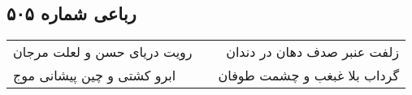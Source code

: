 \begin{center}
\section*{رباعی شماره ۵۰۵}
\label{sec:sh505}
\begin{longtable}{l p{0.5cm} r}
رویت دریای حسن و لعلت مرجان
&&
زلفت عنبر صدف دهان در دندان
\\
ابرو کشتی و چین پیشانی موج
&&
گرداب بلا غبغب و چشمت طوفان
\\
\end{longtable}
\end{center}
